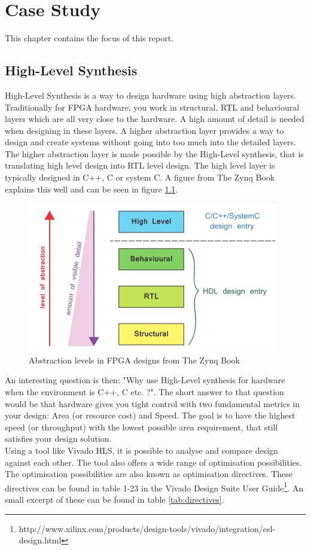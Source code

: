 \chapter{Case Study}
This chapter contains the focus of this report.

\section{High-Level Synthesis}
High-Level Synthesis is a way to design hardware using high abstraction layers. Traditionally for FPGA hardware, you work in structural, RTL and behavioural layers which are all very close to the hardware. A high amount of detail is needed when designing in these layers. A higher abstraction layer provides a way to design and create systems without going into too much  into the detailed layers. The higher abstraction layer is made possible by the High-Level synthesis, that is translating high level design into RTL level design. The high level layer is typically designed in C++, C or system C. A figure from The Zynq Book\cite{crockett2014the} explains this well and can be seen in figure \ref{fig:abslevels}.
\begin{figure}[H]
\centering
\includegraphics[scale=1]{billeder/abslevels}
\caption{Abstraction levels in FPGA designs from The Zynq Book}
\label{fig:abslevels}
\end{figure}
An interesting question is then: "Why use High-Level synthesis for hardware when the environment is C++, C etc. ?". The short answer to that question would be that hardware gives you tight control with two fundamental metrics in your design: Area (or resource cost) and Speed. The goal is to have the highest speed (or throughput) with the lowest possible area requirement, that still satisfies your design solution.\\
Using a tool like Vivado HLS, it is possible to analyse and compare design against each other. The tool also offers a wide range of optimisation possibilities. The  optimisation possibilities are also known as optimisation directives. These directives can be found in table 1-23 in the Vivado Design Suite User Guide\footnote{http://www.xilinx.com/products/design-tools/vivado/integration/esl-design.html}. An small excerpt of these can be found in table \ref{tab:directives}.

